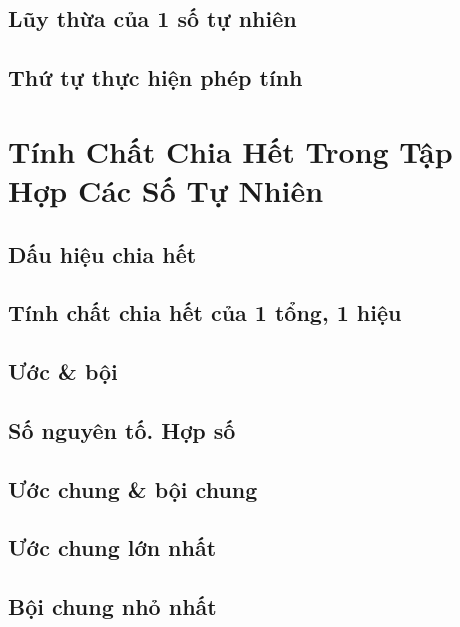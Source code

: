 \documentclass{article}
\numberwithin{equation}{section}
\begin{document}
\subsection{Lũy thừa của 1 số tự nhiên}

\subsection{Thứ tự thực hiện phép tính}


\section{Tính Chất Chia Hết Trong Tập Hợp Các Số Tự Nhiên}

\subsection{Dấu hiệu chia hết}

\subsection{Tính chất chia hết của 1 tổng, 1 hiệu}

\subsection{Ước \& bội}

\subsection{Số nguyên tố. Hợp số}

\subsection{Ước chung \& bội chung}

\subsection{Ước chung lớn nhất}

\subsection{Bội chung nhỏ nhất}

\end{document}
